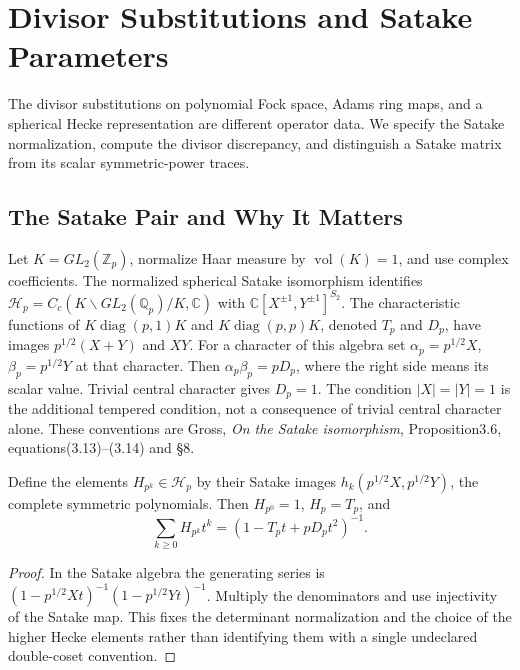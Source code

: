 \chapter{Divisor Substitutions and Satake Parameters}
\label{v4-arith:kazhdan-beilinson}

The divisor substitutions on polynomial Fock space, Adams ring maps,
and a spherical Hecke representation are different operator data.
We specify the Satake normalization, compute the divisor discrepancy,
and distinguish a Satake matrix from its scalar symmetric-power traces.

\section{The Satake Pair and Why It Matters}
\label{v4-arith:kb:satake-pair}

\begin{theorem}
\label{v4-arith:thm:satake-GL2}
Let \(K=GL_2(\mathbb Z_p)\), normalize Haar measure by
\(\operatorname{vol}(K)=1\), and use complex coefficients.
The normalized spherical Satake isomorphism identifies
\(\mathcal H_p=C_c(K\backslash GL_2(\mathbb Q_p)/K,\mathbb C)\)
with \(\mathbb C[X^{\pm1},Y^{\pm1}]^{S_2}\).
The characteristic functions of \(K\operatorname{diag}(p,1)K\)
and \(K\operatorname{diag}(p,p)K\), denoted \(T_p\) and \(D_p\),
have images \(p^{1/2}(X+Y)\) and \(XY\).
For a character of this algebra set
\(\alpha_p=p^{1/2}X\), \(\beta_p=p^{1/2}Y\) at that character.
Then \(\alpha_p\beta_p=pD_p\), where the right side means its
scalar value. Trivial central character gives \(D_p=1\).
The condition \(|X|=|Y|=1\) is the additional tempered condition,
not a consequence of trivial central character alone. These conventions
are Gross, \emph{On the Satake isomorphism}, Proposition3.6,
equations(3.13)--(3.14) and \S8.
\end{theorem}

\begin{proposition}
\label{v4-arith:prop:hecke-generating-function}
Define the elements \(H_{p^k}\in\mathcal H_p\) by their Satake images
\(h_k(p^{1/2}X,p^{1/2}Y)\), the complete symmetric polynomials.
Then \(H_{p^0}=1\), \(H_p=T_p\), and
\[
 \sum_{k\ge0}H_{p^k}t^k=(1-T_pt+pD_pt^2)^{-1}.
\]
\end{proposition}
\begin{proof}
In the Satake algebra the generating series is
\((1-p^{1/2}Xt)^{-1}(1-p^{1/2}Yt)^{-1}\).
Multiply the denominators and use injectivity of the Satake map.
This fixes the determinant normalization and the choice of the
higher Hecke elements rather than identifying them with a single
undeclared double-coset convention.
\end{proof}


